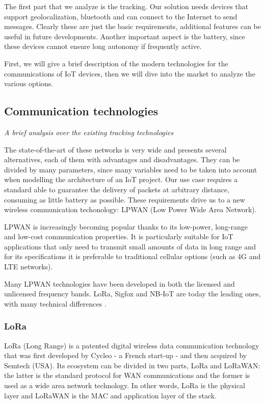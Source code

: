 The first part that we analyze is the tracking. Our solution needs devices that support geolocalization, bluetooth and can connect to the Internet to send messages. Clearly these are just the basic requirements, additional features can be useful in future developments. Another important aspect is the battery, since these devices cannot ensure long autonomy if frequently active. 

First, we will give a brief description of the modern technologies for the communications of IoT devices, then we will dive into the market to analyze the various options.

\subsection{Communication technologies}
\label{sec:track_comm}
\textit{A brief analysis over the existing tracking technologies}

The state-of-the-art of these networks is very wide and presents several alternatives, each of them with advantages and disadvantages. They can be divided by many parameters, since many variables need to be taken into account when modelling the architecture of an IoT project. Our use case requires a standard able to guarantee the delivery of packets at arbitrary distance, consuming as little battery as possible. These requirements drive us to a new wireless communication techonology: LPWAN (Low Power Wide Area Network).

LPWAN is increasingly becoming popular thanks to its low-power, long-range and low-cost communication properties. It is particularly suitable for IoT applications that only need to transmit small amounts of data in long range and for its specifications it is preferable to traditional cellular options (such as 4G and LTE networks).

Many LPWAN technologies have been developed in both the licensed and unlicensed frequency bands. LoRa, Sigfox and NB-IoT are today the leading ones, with many technical differences \cite{LPWAN_study}.

\subsubsection{LoRa}
LoRa (Long Range) is a patented digital wireless data communication technology that was first developed by Cycleo - a French start-up - and then acquired by Semtech (USA). Its ecosystem can be divided in two parts, LoRa and LoRaWAN: the latter is the standard protocol for WAN communications and the former is used as a wide area network technology. In other words, LoRa is the physical layer and LoRaWAN is the MAC and application layer of the stack.

